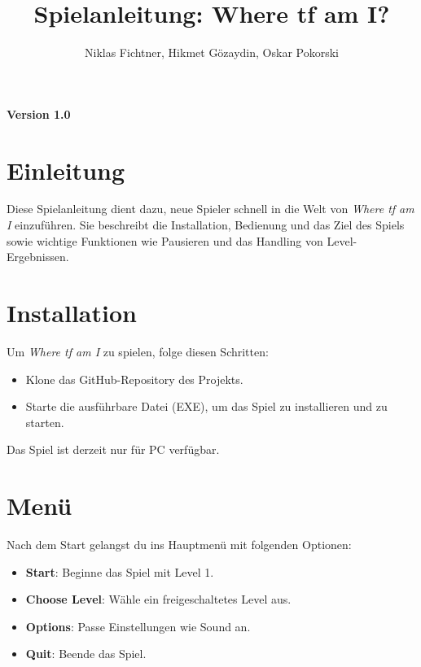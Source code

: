 \documentclass[a4paper,12pt]{article}
\title{Spielanleitung: Where tf am I?}
\author{Niklas Fichtner, Hikmet Gözaydin, Oskar Pokorski}
\begin{document}
\maketitle

\begin{center}
\textbf{Version 1.0}
\end{center}

\tableofcontents
\newpage

\section*{Einleitung}
Diese Spielanleitung dient dazu, neue Spieler schnell in die Welt von \textit{Where tf am I} einzuführen. Sie beschreibt die Installation, Bedienung und das Ziel des Spiels sowie wichtige Funktionen wie Pausieren und das Handling von Level-Ergebnissen.

\newpage

\section{Installation}
\label{sec:installation}

Um \textit{Where tf am I} zu spielen, folge diesen Schritten:

\begin{itemize}
    \item Klone das GitHub-Repository des Projekts.
    \item Starte die ausführbare Datei (EXE), um das Spiel zu installieren und zu starten.
\end{itemize}

Das Spiel ist derzeit nur für PC verfügbar.

\newpage

\section{Menü}
\label{sec:menu}

Nach dem Start gelangst du ins Hauptmenü mit folgenden Optionen:

\begin{itemize}
    \item \textbf{Start}: Beginne das Spiel mit Level 1.
    \item \textbf{Choose Level}: Wähle ein freigeschaltetes Level aus.
    \item \textbf{Options}: Passe Einstellungen wie Sound an.
    \item \textbf{Quit}: Beende das Spiel.
\end{itemize}
\end{document}
